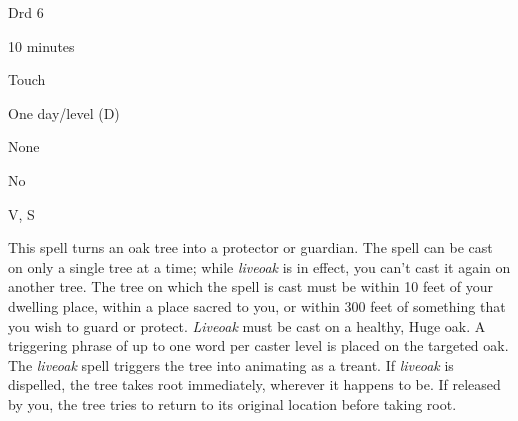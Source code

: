 
\begin{description*}
\item[Level:] Drd 6
\item[Casting Time:] 10 minutes
\item[Range:] Touch
\item[Duration:] One day/level (D)
\item[Saving Throw:] None
\item[Spell Resistance:] No
\item[Components:] V, S
\end{description*}

This spell turns an oak tree into a protector or guardian. The spell can be cast
on only a single tree at a time; while \textit{liveoak} is in effect, you can't
cast it again on another tree. The tree on which the spell is cast must be within
10 feet of your dwelling place, within a place sacred to you, or within 300 feet
of something that you wish to guard or protect.
\textit{Liveoak} must be cast on a healthy, Huge oak. A triggering phrase of up
to one word per caster level is placed on the targeted oak. The \textit{liveoak
}spell triggers the tree into animating as a treant.
If \textit{liveoak} is dispelled, the tree takes root immediately, wherever it
happens to be. If released by you, the tree tries to return to its original location
before taking root.